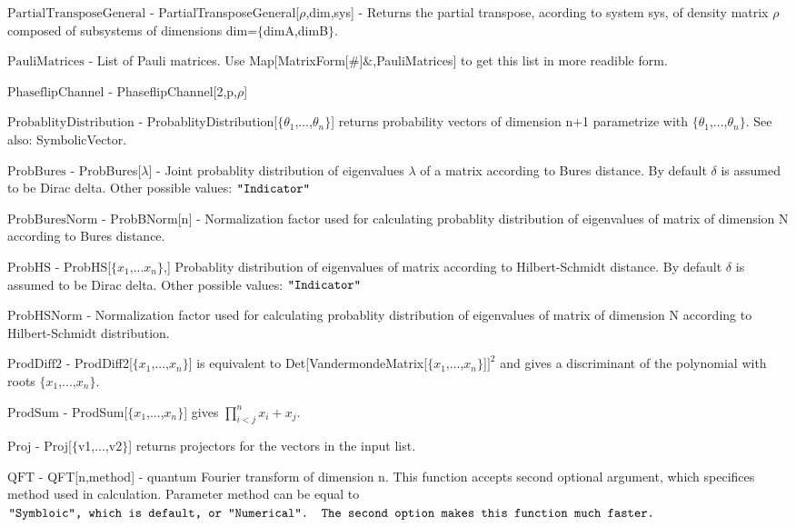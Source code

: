 \documentclass[a4paper,12pt]{article}
\begin{document}
\textbf{$ \text{PartialTransposeGeneral} $ } - PartialTransposeGeneral[$\rho $,dim,sys] - Returns the partial transpose, acording to system sys, of density matrix $\rho $ composed of subsystems of dimensions dim=$\{$dimA,dimB$\}$. $  $

\textbf{$ \text{PauliMatrices} $ } - List of Pauli matrices. Use Map[MatrixForm[$\#$]$\&$,PauliMatrices] to get this list in more readible form.$  $

\textbf{$ \text{PhaseflipChannel} $ } - PhaseflipChannel[2,p,$\rho $]$  $

\textbf{$ \text{ProbablityDistribution} $ } - ProbablityDistribution[$\{$$ \theta _1 $,...,$ \theta _n $$\}$] returns probability vectors of dimension n+1 parametrize with $\{$$ \theta _1 $,...,$ \theta _n $$\}$. See also: SymbolicVector.$  $

\textbf{$ \text{ProbBures} $ } - ProbBures[$\lambda $] - Joint probablity distribution of eigenvalues $\lambda $ of a matrix according to Bures distance. By default $\delta $ is assumed to be Dirac delta. Other possible values: $\texttt{"$ $Indicator$\texttt{"}$} $

\textbf{$ \text{ProbBuresNorm} $ } - ProbBNorm[n] - Normalization factor used for calculating probablity distribution of eigenvalues of matrix of dimension N according to Bures distance.$  $

\textbf{$ \text{ProbHS} $ } - ProbHS[$\{$$ x_1\text{,...}x_n $$\}$,] Probablity distribution of eigenvalues of matrix according to Hilbert-Schmidt distance. By default $\delta $ is assumed to be Dirac delta. Other possible values: $\texttt{"$ $Indicator$\texttt{"}$} $

\textbf{$ \text{ProbHSNorm} $ } - Normalization factor used for calculating probablity distribution of eigenvalues of matrix of dimension N according to Hilbert-Schmidt distribution.$  $

\textbf{$ \text{ProdDiff2} $ } - ProdDiff2[$\{$$ x_1 $,...,$ x_n $$\}$] is equivalent to Det[VandermondeMatrix[$\{$$ x_1 $,...,$ x_n $$\}$]$ ]^2 $ and gives a discriminant of the polynomial with roots $\{$$ x_1 $,...,$ x_n $$\}$.$  $

\textbf{$ \text{ProdSum} $ } - ProdSum[$\{$$ x_1 $,...,$ x_n $$\}$] gives $ \prod _{i<j}^nx_i+x_j. $

\textbf{$ \text{Proj} $ } - Proj[$\{$v1,...,v2$\}$] returns projectors for the vectors in the input list.$  $

\textbf{$ \text{QFT} $ } - QFT[n,method] - quantum Fourier transform of dimension n. This function accepts second optional argument, which specifices method used in calculation. Parameter method can be equal to $\texttt{"$ $Symbloic$\texttt{"}$, which is default, or $\texttt{"}$Numerical$\texttt{"}$. The second option makes this function much faster.} $
\end{document}
